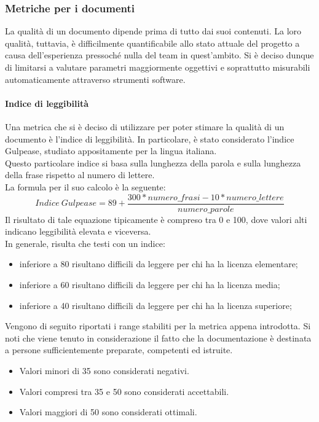			\subsubsection{Metriche per i documenti}
				La qualità di un documento dipende prima di tutto dai suoi contenuti. La loro qualità, tuttavia, è difficilmente quantificabile allo 
				stato attuale del progetto a causa dell'esperienza pressoché nulla del team in quest'ambito. Si è deciso dunque di limitarsi a valutare 
				parametri maggiormente oggettivi e soprattutto misurabili automaticamente attraverso strumenti software.
				\paragraph{Indice di leggibilità}
					Una metrica che si è deciso di utilizzare per poter stimare la qualità di un documento è l'indice di leggibilità. In particolare, è 
					stato considerato l'indice Gulpease, studiato appositamente per la lingua italiana.\\
					Questo particolare indice si basa sulla lunghezza della parola e sulla lunghezza della frase rispetto al numero di lettere.\\
					La formula per il suo calcolo è la seguente:
					\begin{equation}
						\label{Indice Gulpease}
						Indice\ Gulpease = 89 + \frac{300*numero\_frasi-10*numero\_lettere}{numero\_parole}
					\end{equation}
					Il risultato di tale equazione tipicamente è compreso tra 0 e 100, dove valori alti indicano leggibilità elevata e viceversa.\\
					In generale, risulta che testi con un indice:
					\begin{itemize}
						\item inferiore a 80 risultano difficili da leggere per chi ha la licenza elementare;
						\item inferiore a 60 risultano difficili da leggere per chi ha la licenza media;
						\item inferiore a 40 risultano difficili da leggere per chi ha la licenza superiore;
					\end{itemize}
					Vengono di seguito riportati i range stabiliti per la metrica appena introdotta. Si noti che viene tenuto in considerazione il fatto 
					che la documentazione è destinata a persone sufficientemente preparate, competenti ed istruite.
					\begin{itemize}
						\item Valori minori di 35 sono considerati negativi.
						\item Valori compresi tra 35 e 50 sono considerati accettabili.
						\item Valori maggiori di 50 sono considerati ottimali.
					\end{itemize}
